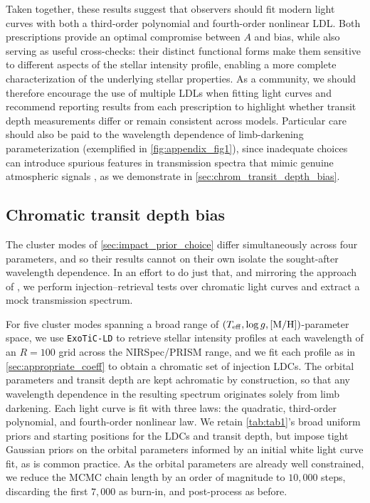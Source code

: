 \documentclass[twocolumn]{aastex631}
\newcommand{\vtwo}[1]{{#1}}
\begin{document}
Taken together, these results suggest that observers should fit modern light curves with both a third-order polynomial and fourth-order nonlinear LDL. Both prescriptions provide an optimal compromise between $A$ and bias, while also serving as useful cross-checks: their distinct functional forms make them sensitive to different aspects of the stellar intensity profile, enabling a more complete characterization of the underlying stellar properties. As a community, we should therefore encourage the use of multiple LDLs when fitting light curves and recommend reporting results from each prescription to highlight whether transit depth measurements differ or remain consistent across models. Particular care should also be paid to the wavelength dependence of limb-darkening \vtwo{parameterization} (exemplified in \autoref{fig:appendix_fig1}), since inadequate choices can introduce spurious features in transmission spectra that mimic genuine atmospheric signals \citep[e.g.,][]{Keers2024}, \vtwo{as we demonstrate in \autoref{sec:chrom_transit_depth_bias}.}

\subsection{\vtwo{Chromatic transit depth bias}}\label{sec:chrom_transit_depth_bias}

\vtwo{The cluster modes of \autoref{sec:impact_prior_choice} differ simultaneously across four parameters, and so their results cannot on their own isolate the sought-after wavelength dependence. In an effort to do just that, and mirroring the approach of \cite{Keers2024}, we perform injection--retrieval tests over chromatic light curves and extract a mock transmission spectrum.}

\vtwo{For five cluster modes spanning a broad range of $(T_{\rm eff}, \log g, [{\rm M/H}])$-parameter space, we use \texttt{ExoTiC-LD} to retrieve stellar intensity profiles at each wavelength of an $R=100$ grid across the NIRSpec/PRISM range, and we fit each profile as in \autoref{sec:appropriate_coeff} to obtain a chromatic set of injection LDCs. The orbital parameters and transit depth are kept achromatic by construction, so that any wavelength dependence in the resulting spectrum originates solely from limb darkening. Each light curve is fit with three laws: the quadratic, third-order polynomial, and fourth-order nonlinear law. We retain \autoref{tab:tab1}'s broad uniform priors and starting positions for the LDCs and transit depth, but impose tight Gaussian priors on the orbital parameters informed by an initial white light curve fit, as is common practice. As the orbital parameters are already well constrained, we reduce the MCMC chain length by an order of magnitude to $10{,}000$ steps, discarding the first $7{,}000$ as burn-in, and post-process as before.}
\end{document}
